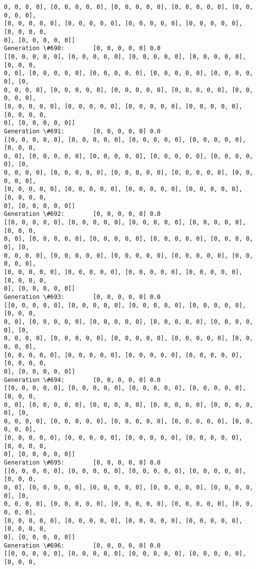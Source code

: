 \documentclass[11pt]{article}
\begin{document}
\begin{Verbatim}[commandchars=\\\{\}]
0, 0, 0, 0], [0, 0, 0, 0, 0], [0, 0, 0, 0, 0], [0, 0, 0, 0, 0], [0, 0, 0, 0, 0],
[0, 0, 0, 0, 0], [0, 0, 0, 0, 0], [0, 0, 0, 0, 0], [0, 0, 0, 0, 0], [0, 0, 0, 0,
0], [0, 0, 0, 0, 0]]
Generation \#690:        [0, 0, 0, 0, 0] 0.0
[[0, 0, 0, 0, 0], [0, 0, 0, 0, 0], [0, 0, 0, 0, 0], [0, 0, 0, 0, 0], [0, 0, 0,
0, 0], [0, 0, 0, 0, 0], [0, 0, 0, 0, 0], [0, 0, 0, 0, 0], [0, 0, 0, 0, 0], [0,
0, 0, 0, 0], [0, 0, 0, 0, 0], [0, 0, 0, 0, 0], [0, 0, 0, 0, 0], [0, 0, 0, 0, 0],
[0, 0, 0, 0, 0], [0, 0, 0, 0, 0], [0, 0, 0, 0, 0], [0, 0, 0, 0, 0], [0, 0, 0, 0,
0], [0, 0, 0, 0, 0]]
Generation \#691:        [0, 0, 0, 0, 0] 0.0
[[0, 0, 0, 0, 0], [0, 0, 0, 0, 0], [0, 0, 0, 0, 0], [0, 0, 0, 0, 0], [0, 0, 0,
0, 0], [0, 0, 0, 0, 0], [0, 0, 0, 0, 0], [0, 0, 0, 0, 0], [0, 0, 0, 0, 0], [0,
0, 0, 0, 0], [0, 0, 0, 0, 0], [0, 0, 0, 0, 0], [0, 0, 0, 0, 0], [0, 0, 0, 0, 0],
[0, 0, 0, 0, 0], [0, 0, 0, 0, 0], [0, 0, 0, 0, 0], [0, 0, 0, 0, 0], [0, 0, 0, 0,
0], [0, 0, 0, 0, 0]]
Generation \#692:        [0, 0, 0, 0, 0] 0.0
[[0, 0, 0, 0, 0], [0, 0, 0, 0, 0], [0, 0, 0, 0, 0], [0, 0, 0, 0, 0], [0, 0, 0,
0, 0], [0, 0, 0, 0, 0], [0, 0, 0, 0, 0], [0, 0, 0, 0, 0], [0, 0, 0, 0, 0], [0,
0, 0, 0, 0], [0, 0, 0, 0, 0], [0, 0, 0, 0, 0], [0, 0, 0, 0, 0], [0, 0, 0, 0, 0],
[0, 0, 0, 0, 0], [0, 0, 0, 0, 0], [0, 0, 0, 0, 0], [0, 0, 0, 0, 0], [0, 0, 0, 0,
0], [0, 0, 0, 0, 0]]
Generation \#693:        [0, 0, 0, 0, 0] 0.0
[[0, 0, 0, 0, 0], [0, 0, 0, 0, 0], [0, 0, 0, 0, 0], [0, 0, 0, 0, 0], [0, 0, 0,
0, 0], [0, 0, 0, 0, 0], [0, 0, 0, 0, 0], [0, 0, 0, 0, 0], [0, 0, 0, 0, 0], [0,
0, 0, 0, 0], [0, 0, 0, 0, 0], [0, 0, 0, 0, 0], [0, 0, 0, 0, 0], [0, 0, 0, 0, 0],
[0, 0, 0, 0, 0], [0, 0, 0, 0, 0], [0, 0, 0, 0, 0], [0, 0, 0, 0, 0], [0, 0, 0, 0,
0], [0, 0, 0, 0, 0]]
Generation \#694:        [0, 0, 0, 0, 0] 0.0
[[0, 0, 0, 0, 0], [0, 0, 0, 0, 0], [0, 0, 0, 0, 0], [0, 0, 0, 0, 0], [0, 0, 0,
0, 0], [0, 0, 0, 0, 0], [0, 0, 0, 0, 0], [0, 0, 0, 0, 0], [0, 0, 0, 0, 0], [0,
0, 0, 0, 0], [0, 0, 0, 0, 0], [0, 0, 0, 0, 0], [0, 0, 0, 0, 0], [0, 0, 0, 0, 0],
[0, 0, 0, 0, 0], [0, 0, 0, 0, 0], [0, 0, 0, 0, 0], [0, 0, 0, 0, 0], [0, 0, 0, 0,
0], [0, 0, 0, 0, 0]]
Generation \#695:        [0, 0, 0, 0, 0] 0.0
[[0, 0, 0, 0, 0], [0, 0, 0, 0, 0], [0, 0, 0, 0, 0], [0, 0, 0, 0, 0], [0, 0, 0,
0, 0], [0, 0, 0, 0, 0], [0, 0, 0, 0, 0], [0, 0, 0, 0, 0], [0, 0, 0, 0, 0], [0,
0, 0, 0, 0], [0, 0, 0, 0, 0], [0, 0, 0, 0, 0], [0, 0, 0, 0, 0], [0, 0, 0, 0, 0],
[0, 0, 0, 0, 0], [0, 0, 0, 0, 0], [0, 0, 0, 0, 0], [0, 0, 0, 0, 0], [0, 0, 0, 0,
0], [0, 0, 0, 0, 0]]
Generation \#696:        [0, 0, 0, 0, 0] 0.0
[[0, 0, 0, 0, 0], [0, 0, 0, 0, 0], [0, 0, 0, 0, 0], [0, 0, 0, 0, 0], [0, 0, 0,

\end{Verbatim}
\end{document}
